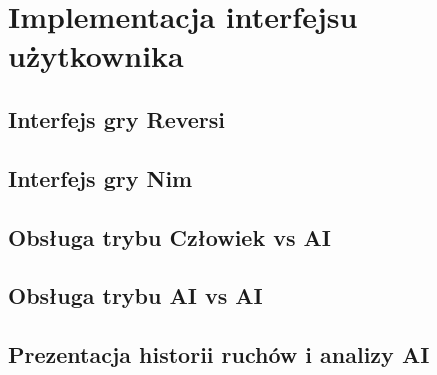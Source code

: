 \chapter{Implementacja interfejsu użytkownika}

\section{Interfejs gry Reversi}

\section{Interfejs gry Nim}

\section{Obsługa trybu Człowiek vs AI}

\section{Obsługa trybu AI vs AI}

\section{Prezentacja historii ruchów i analizy AI}
